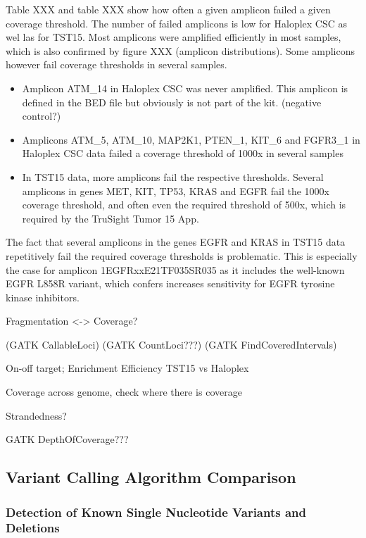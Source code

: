 Table XXX and table XXX show how often a given amplicon failed a given coverage
threshold. The number of failed amplicons is low for Haloplex CSC as wel las for TST15.
Most amplicons were amplified efficiently in most samples, which is also confirmed by figure XXX (amplicon distributions). Some amplicons however
fail coverage thresholds in several samples.
\begin{itemize}
    \item Amplicon ATM\_14 in Haloplex CSC was never amplified. This amplicon is defined in the BED file but obviously is not part of the kit. (negative control?)
    \item Amplicons ATM\_5, ATM\_10, MAP2K1, PTEN\_1, KIT\_6 and FGFR3\_1 in Haloplex CSC data failed a coverage threshold of 1000x in several samples
    \item In TST15 data, more amplicons fail the respective thresholds. Several amplicons in genes MET, KIT, TP53, KRAS and EGFR fail the 1000x coverage threshold, and often even the required threshold of 500x, which is required by the TruSight Tumor 15 App.
\end{itemize}

The fact that several amplicons in the genes EGFR and KRAS in TST15 data
repetitively fail the required coverage thresholds is problematic. This is
especially the case for amplicon 1EGFRxxE21TF035SR035 as it includes the
well-known EGFR L858R variant, which confers increases sensitivity for EGFR
tyrosine kinase inhibitors.

Fragmentation <-> Coverage?

(GATK CallableLoci)
(GATK CountLoci???)
(GATK FindCoveredIntervals)

On-off target; Enrichment Efficiency TST15 vs Haloplex

Coverage across genome, check where there is coverage

Strandedness?

GATK DepthOfCoverage???

\subsection{Variant Calling Algorithm Comparison}

\subsubsection{Detection of Known Single Nucleotide Variants and Deletions}

